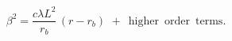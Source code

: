 \begin{equation}
\beta^{2}= \frac{c\lambda L^2}{r_{b}}\,(r-r_{b})\,\, +\,\,\, \mathrm{
higher\,\,\,order\,\,\,terms}. \label{betaint}
\end{equation}

